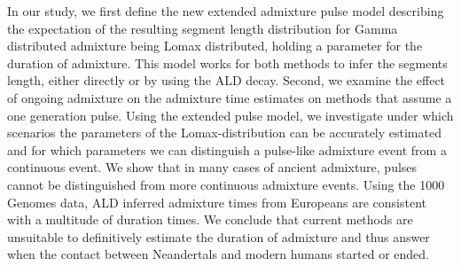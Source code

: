 \documentclass[]{article}
\begin{document}
In our study, we first define the new extended admixture pulse model describing the expectation of the resulting segment length distribution for Gamma distributed admixture being Lomax distributed, holding a parameter for the duration of admixture. This model works for
both methods to infer the segments length, either directly or by using
the ALD decay. Second, we examine the effect of ongoing admixture on the admixture time estimates on methods that assume a one generation pulse. Using the extended pulse model, we investigate under which scenarios the parameters of the Lomax-distribution can be accurately estimated and for which parameters we can distinguish a pulse-like admixture event from a continuous event. We show that in many cases of ancient admixture, pulses cannot be distinguished from more continuous admixture events. Using the 1000 Genomes data, ALD inferred admixture times from Europeans are consistent with a multitude of duration times.
We conclude that current methods are unsuitable to definitively estimate the duration of admixture and thus answer when the contact between Neandertals and modern humans started or ended.

\hypertarget{refs}{}


\end{document}
